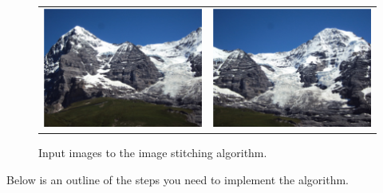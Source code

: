 \documentclass[10pt,letterpaper]{article}
\begin{document}
\begin{figure}[h]
\centering
\begin{tabular}{cc}
\includegraphics[width=0.45\linewidth]{./fig/hill1.jpg} &
\includegraphics[width=0.45\linewidth]{./fig/hill2.jpg} \\
\end{tabular}
\caption{\label{fig:inputs} Input images to the image stitching algorithm.}
\end{figure}


Below is an outline of the steps you need to implement the algorithm.
\end{document}

